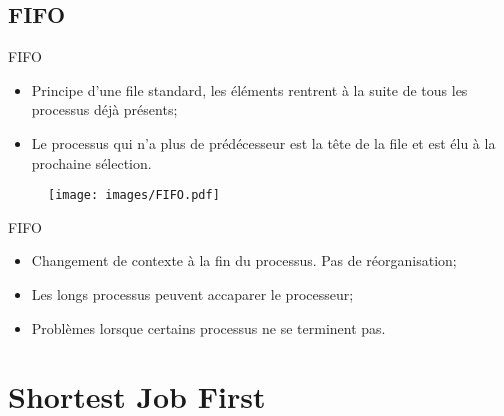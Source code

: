 \begin{frame}{\sectitle}

\def\subsectitle{FIFO}
\subsection{\subsectitle}

\begin{block}{\subsectitle}
\begin{itemize}
    \item Principe d'une file standard, les éléments rentrent à la suite de tous
    les processus déjà présents;
    \item Le processus qui n'a plus de prédécesseur est la tête de la file et
    est élu à la prochaine sélection.
\end{itemize}
\end{block}


\begin{figure}
\texttt{[image: images/FIFO.pdf]}
\end{figure}

\begin{exampleblock}{\subsectitle}
\begin{itemize}
    \item Changement de contexte à la fin du processus. Pas de réorganisation;
    \item Les longs processus peuvent accaparer le processeur;
    \item Problèmes lorsque certains processus ne se terminent pas.
\end{itemize}
\end{exampleblock}

\end{frame}


\def\sectitle{Shortest Job First}
\section{\sectitle}

